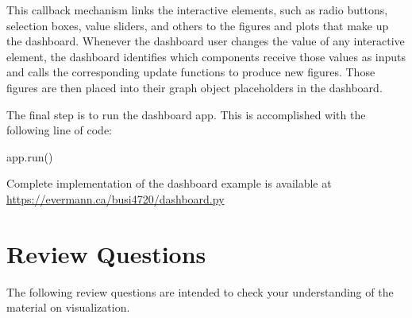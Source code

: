 \begin{withcode}
This callback mechanism links the interactive elements, such as radio buttons, selection boxes, value sliders, and others to the figures and plots that make up the dashboard. Whenever the dashboard user changes the value of any interactive element, the dashboard identifies which components receive those values as inputs and calls the corresponding update functions to produce new figures. Those figures are then placed into their graph object placeholders in the dashboard. 

The final step is to run the dashboard app. This is accomplished with the following line of code:

\begin{pythoncode}
app.run()
\end{pythoncode}

\end{withcode}

\begin{resourcebox}
Complete implementation of the dashboard example is available at
\url{https://evermann.ca/busi4720/dashboard.py} \\
\end{resourcebox}

\FloatBarrier

\section{Review Questions}

The following review questions are intended to check your understanding of the material on visualization.

